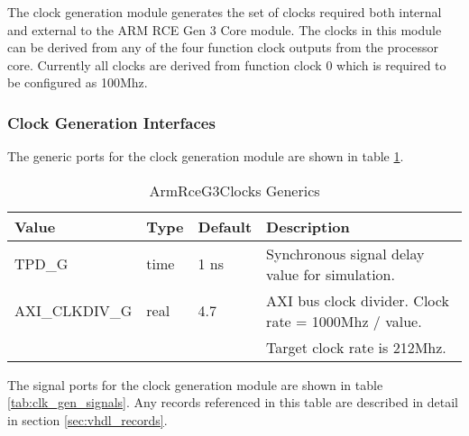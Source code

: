 \documentclass[11pt]{article}
\begin{document}
The clock generation module generates the set of clocks required both internal and external to
the ARM RCE Gen 3 Core module. The clocks in this module can be derived from any of the four function 
clock outputs from the processor core. Currently all clocks are derived from function clock 0 which is
required to be configured as 100Mhz.

\subsubsection{Clock Generation Interfaces}

The generic ports for the clock generation module are shown in table \ref{tab:clk_gen_generics}.

\begin{table}[H]
\small
\centering
   \begin{tabular}{| l | l | l | l | }
      \hline \textbf{Value} & \textbf{Type} & \textbf{Default} & \textbf{Description} \\
      \hline TPD\_G          & time    & 1 ns & Synchronous signal delay value for simulation.   \\
      \hline AXI\_CLKDIV\_G  & real    & 4.7   & AXI bus clock divider. Clock rate = 1000Mhz / value. \\
                             &         &       & Target clock rate is 212Mhz.                         \\
      \hline
   \end{tabular}
   \caption{ArmRceG3Clocks Generics}
   \label{tab:clk_gen_generics}
\end{table}

The signal ports for the clock generation module are shown in table \ref{tab:clk_gen_signals}.
Any records referenced in this table are described in detail in section \ref{sec:vhdl_records}. 
\end{document}
